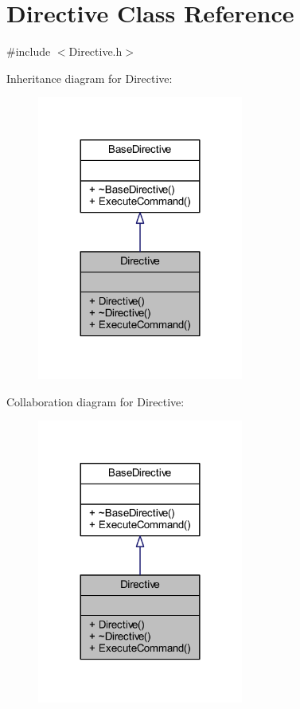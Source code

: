 \hypertarget{class_directive}{}\section{Directive Class Reference}
\label{class_directive}


{\ttfamily \#include $<$Directive.\+h$>$}



Inheritance diagram for Directive\+:\nopagebreak
\begin{figure}[H]
\begin{center}
\leavevmode
\includegraphics[width=192pt]{class_directive__inherit__graph}
\end{center}
\end{figure}


Collaboration diagram for Directive\+:\nopagebreak
\begin{figure}[H]
\begin{center}
\leavevmode
\includegraphics[width=192pt]{class_directive__coll__graph}
\end{center}
\end{figure}
